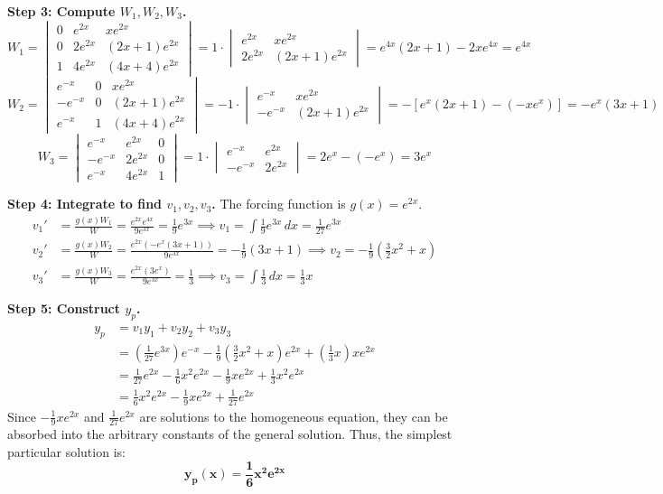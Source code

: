 \documentclass[12pt]{article}
\begin{document}
\textbf{Step 3: Compute $W_1, W_2, W_3$.}
\[ W_1 = \begin{vmatrix} 0 & e^{2x} & x e^{2x} \\ 0 & 2e^{2x} & (2x+1)e^{2x} \\ 1 & 4e^{2x} & (4x+4)e^{2x} \end{vmatrix} = 1 \cdot \begin{vmatrix} e^{2x} & x e^{2x} \\ 2e^{2x} & (2x+1)e^{2x} \end{vmatrix} = e^{4x}(2x+1) - 2x e^{4x} = e^{4x} \]
\[ W_2 = \begin{vmatrix} e^{-x} & 0 & x e^{2x} \\ -e^{-x} & 0 & (2x+1)e^{2x} \\ e^{-x} & 1 & (4x+4)e^{2x} \end{vmatrix} = -1 \cdot \begin{vmatrix} e^{-x} & x e^{2x} \\ -e^{-x} & (2x+1)e^{2x} \end{vmatrix} = -[e^x(2x+1) - (-x e^x)] = -e^x(3x+1) \]
\[ W_3 = \begin{vmatrix} e^{-x} & e^{2x} & 0 \\ -e^{-x} & 2e^{2x} & 0 \\ e^{-x} & 4e^{2x} & 1 \end{vmatrix} = 1 \cdot \begin{vmatrix} e^{-x} & e^{2x} \\ -e^{-x} & 2e^{2x} \end{vmatrix} = 2e^x - (-e^x) = 3e^x \]

\textbf{Step 4: Integrate to find $v_1, v_2, v_3$.}
The forcing function is $g(x) = e^{2x}$.
\begin{align*}
v_1' &= \frac{g(x)W_1}{W} = \frac{e^{2x} e^{4x}}{9e^{3x}} = \frac{1}{9}e^{3x} \implies v_1 = \int \frac{1}{9}e^{3x} \, dx = \frac{1}{27}e^{3x} \\
v_2' &= \frac{g(x)W_2}{W} = \frac{e^{2x} (-e^x(3x+1))}{9e^{3x}} = -\frac{1}{9}(3x+1) \implies v_2 = -\frac{1}{9}\left(\frac{3}{2}x^2 + x\right) \\
v_3' &= \frac{g(x)W_3}{W} = \frac{e^{2x} (3e^x)}{9e^{3x}} = \frac{1}{3} \implies v_3 = \int \frac{1}{3} \, dx = \frac{1}{3}x
\end{align*}

\textbf{Step 5: Construct $y_p$.}
\begin{align*}
y_p &= v_1 y_1 + v_2 y_2 + v_3 y_3 \\
&= \left(\frac{1}{27}e^{3x}\right)e^{-x} - \frac{1}{9}\left(\frac{3}{2}x^2 + x\right)e^{2x} + \left(\frac{1}{3}x\right)x e^{2x} \\
&= \frac{1}{27}e^{2x} - \frac{1}{6}x^2 e^{2x} - \frac{1}{9}x e^{2x} + \frac{1}{3}x^2 e^{2x} \\
&= \frac{1}{6}x^2 e^{2x} - \frac{1}{9}x e^{2x} + \frac{1}{27}e^{2x}
\end{align*}
Since $-\frac{1}{9}x e^{2x}$ and $\frac{1}{27}e^{2x}$ are solutions to the homogeneous equation, they can be absorbed into the arbitrary constants of the general solution. Thus, the simplest particular solution is:
\[ \mathbf{y_p(x) = \frac{1}{6}x^2 e^{2x}} \]
\end{document}
